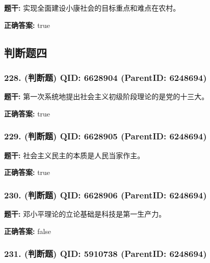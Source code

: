 \documentclass[12pt,UTF8]{ctexart}
\begin{document}
\textbf{题干:}
实现全面建设小康社会的目标重点和难点在农村。



\textbf{正确答案:}
true

\vspace{0.3em}\hrulefill\vspace{0.7em}

\subsection*{判断题四}

\subsubsection*{228. (判断题) \small QID: 6628904 (ParentID: 6248694)}

\textbf{题干:}
第一次系统地提出社会主义初级阶段理论的是党的十三大。



\textbf{正确答案:}
true

\vspace{0.3em}\hrulefill\vspace{0.7em}

\subsubsection*{229. (判断题) \small QID: 6628905 (ParentID: 6248694)}

\textbf{题干:}
社会主义民主的本质是人民当家作主。



\textbf{正确答案:}
true

\vspace{0.3em}\hrulefill\vspace{0.7em}

\subsubsection*{230. (判断题) \small QID: 6628906 (ParentID: 6248694)}

\textbf{题干:}
邓小平理论的立论基础是科技是第一生产力。



\textbf{正确答案:}
false

\vspace{0.3em}\hrulefill\vspace{0.7em}

\subsubsection*{231. (判断题) \small QID: 5910738 (ParentID: 6248694)}
\end{document}
